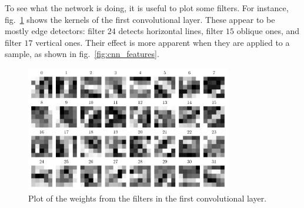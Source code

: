\documentclass[11pt,a4paper]{scrartcl}
\begin{document}
\medskip

To see what the network is doing, it is useful to plot some filters. For instance, fig.~\ref{fig:cnn_weights} shows the kernels of the first convolutional layer. These appear to be mostly edge detectors: filter $24$ detects horizontal lines, filter $15$ oblique ones, and filter $17$ vertical ones. Their effect is more apparent when they are applied to a sample, as shown in fig.~\ref{fig:cnn_features}. 


\begin{figure}[ht]
    \centering
    \includegraphics[width=0.8\textwidth]{../02_Classification/Plots/cnn_weights}
    \caption{Plot of the weights from the filters in the first convolutional layer.\label{fig:cnn_weights}}
\end{figure}
\end{document}
